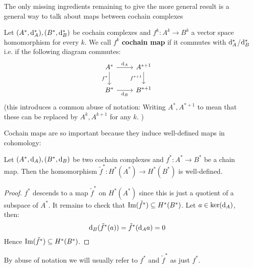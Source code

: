 The only missing ingredients remaining to give the more general result is a general way to
talk about maps between cochain complexes
\begin{definition}
Let $(A^*, \mathrm{d}_A^*), (B^*, \mathrm{d}_B^*)$ be cochain complexes and $f^k: A^k \to B^k$ a vector
space homomorphism for every $k$. We call $f^k$ \textbf{cochain map} if it commutes with
$\mathrm{d}_A^*$/$\mathrm{d}_B^*$ i.e. if the following diagram commutes:
\[\begin{tikzcd}
	{A^*} & {A^{* + 1}} \\
	{B^*} & {B^{* + 1}}
	\arrow["{\mathrm{d}_A}", from=1-1, to=1-2]
	\arrow["{f^*}"', from=1-1, to=2-1]
	\arrow["{f^{* + 1}}"', from=1-2, to=2-2]
	\arrow["{\mathrm{d}_B}"', from=2-1, to=2-2]
\end{tikzcd}\]
(this introduces a common abuse of notation: Writing $A^*, A^{* + 1}$ to mean that these can be
replaced by $A^k, A^{k + 1}$ for any $k$.
)
\end{definition}
Cochain maps are so important because they induce well-defined maps in cohomology:
\begin{lemma}
Let $(A^*, \mathrm{d}_A), (B^*, \mathrm{d}_B)$ be two cochain complexes and $f^*: A^* \to B^*$ be a chain
map. Then the homomorphism $\tilde{f}^*: H^*(A^*) \to H^*(B^*)$ is well-defined.
\end{lemma}
\begin{proof}
$f^*$ descends to a map $\tilde{f}^*$ on $H^*(A^*)$ since this is just a quotient of a
subspace of $A^*$. It remains to check that $\operatorname{Im}(\tilde{f}^*) \subseteq H^*(B^*)$. Let
$a \in \ker(\mathrm{d}_A)$, then:
\begin{align*}
\mathrm{d}_B(\tilde{f}^*(a)) = \tilde{f}^*(\mathrm{d}_A a) = 0
\end{align*}
Hence $\operatorname{Im}(\tilde{f}^*) \subseteq H^*(B^*)$.
\end{proof}
By abuse of notation we will usually refer to $f^*$ and $\tilde{f}^*$ as just $f^*$.

